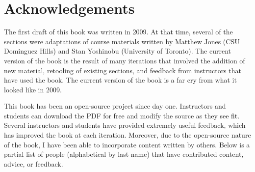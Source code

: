 \chapter*{Acknowledgements}\label{chap:acknowledgements}

The first draft of this book was written in 2009. At that time, several of the sections were adaptations of course materials written by Matthew Jones (CSU Dominguez Hills) and Stan Yoshinobu (University of Toronto). The current version of the book is the result of many iterations that involved the addition of new material, retooling of existing sections, and feedback from instructors that have used the book. The current version of the book is a far cry from what it looked like in 2009.

This book has been an open-source project since day one. Instructors and students can download the PDF for free and modify the source as they see fit. Several instructors and students have provided extremely useful feedback, which has improved the book at each iteration. Moreover, due to the open-source nature of the book, I have been able to incorporate content written by others. Below is a partial list of people (alphabetical by last name) that have contributed content, advice, or feedback.

